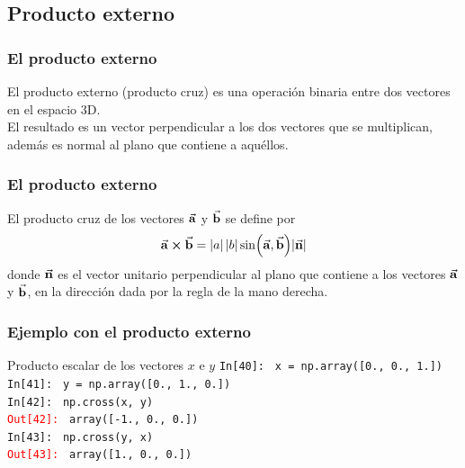 \subsection{Producto externo}
\begin{frame}
\frametitle{El producto externo}
El producto externo (producto cruz) es una operación binaria entre dos vectores en el espacio 3D.
\\
\bigskip
El resultado es un vector perpendicular a los dos vectores que se multiplican, además es normal al plano que contiene a aquéllos.
\end{frame}
\begin{frame}
\frametitle{El producto externo}
El producto cruz de los vectores $\va{a}$ y $\va{b}$ se define por
\begin{align*}
\va{a} \cp \va{b} = \abs{a} \, \abs{b} \sin(\va{a}, \va{b}) \abs{\va{n}}
\end{align*}
donde $\va{n}$ es el vector unitario perpendicular al plano que contiene a los vectores $\va{a}$ y $\va{b}$, en la dirección dada por la regla de la mano derecha.
\end{frame}
\begin{frame}[fragile]
\frametitle{Ejemplo con el producto externo}
\fontsize{12}{12}\selectfont
\begin{exampleblock}{Producto escalar de los vectores $x$ e $y$}
\textcolor{ao}{\texttt{In[40]: }} \texttt{x = np.array([0., 0., 1.])} \\
\medskip
\pause
\textcolor{ao}{\texttt{In[41]: }} \texttt{y = np.array([0., 1., 0.])} \\
\medskip
\pause
\textcolor{ao}{\texttt{In[42]: }} \texttt{np.cross(x, y)} \\
\medskip
\pause
\textcolor{red}{\texttt{Out[42]: }} \texttt{array([-1.,  0.,  0.])} \\
\medskip
\pause
\textcolor{ao}{\texttt{In[43]: }} \texttt{np.cross(y, x)} \\
\medskip
\pause
\textcolor{red}{\texttt{Out[43]: }} \texttt{array([1., 0., 0.])}
\end{exampleblock}
\end{frame}
